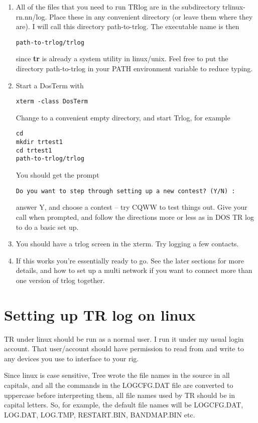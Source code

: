 \documentclass[12pt]{article}
\begin{document}
\begin{enumerate}
\item
All of the files that you need to run TRlog are in the subdirectory
trlinux-rn.nn/log.
Place these in any convenient directory (or leave them where they are).
I will call this directory path-to-trlog.
The executable name is then
\begin{verbatim}
path-to-trlog/trlog
\end{verbatim}
since {\bf tr} is already a system utility in
linux/unix. Feel free to put the directory path-to-trlog in your PATH
environment variable to reduce typing.
\item
Start a DosTerm  with
\begin{verbatim}
xterm -class DosTerm
\end{verbatim}
Change to a convenient empty directory, and start Trlog, for example
\begin{verbatim}
cd
mkdir trtest1
cd trtest1
path-to-trlog/trlog
\end{verbatim}
You should get the prompt
\begin{verbatim}
Do you want to step through setting up a new contest? (Y/N) :
\end{verbatim}
answer Y, and choose a contest -- try CQWW to test things out. 
Give your call when prompted, and follow the directions more or less
as in DOS TR log to do a basic set up.
\item
You should have a trlog screen in the xterm.
Try logging a few contacts. 
\item
If this works you're essentially ready to go. See the later
sections for more details, and how to set up a multi network if you
want to connect more than one version of trlog together.
\end{enumerate}

\section{Setting up TR log on linux}
TR under linux should be run as a normal user. I run it under my usual
login account. That user/account should have permission to read from and
write to any devices you use to interface to your rig.

Since linux is case sensitive, Tree wrote the file names in the
source in all capitals, and all the commands in the LOGCFG.DAT file
are converted to uppercase before interpreting them, all file names used
by TR should be in capital letters. So,
for example, the default file names will be
LOGCFG.DAT, LOG.DAT, LOG.TMP, RESTART.BIN, BANDMAP.BIN etc.
\end{document}
